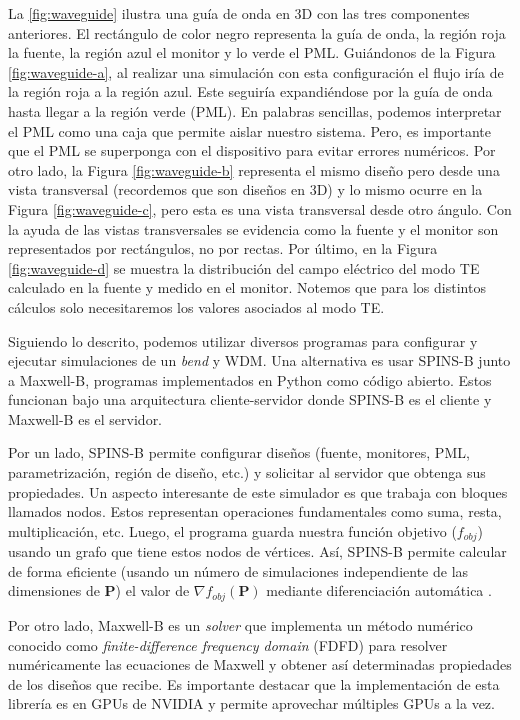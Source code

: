 La \autoref{fig:waveguide} ilustra una guía de onda en 3D con las tres componentes anteriores.
El rectángulo de color negro representa la guía de onda, la región roja la fuente, 
la región azul el monitor y lo verde el PML.
Guiándonos de la Figura \autoref{fig:waveguide-a}, al realizar una simulación con esta configuración 
el flujo iría de la región roja a la región azul. Este seguiría expandiéndose por la guía de onda hasta llegar a la región verde (PML).
En palabras sencillas, podemos interpretar el PML como una caja que permite aislar nuestro sistema. 
Pero, es importante que el PML se superponga con el dispositivo para evitar errores numéricos.
Por otro lado, la Figura \autoref{fig:waveguide-b} representa el mismo diseño pero desde una vista transversal
(recordemos que son diseños en 3D) y lo mismo ocurre en la Figura \autoref{fig:waveguide-c}, pero esta es una
vista transversal desde otro ángulo.
Con la ayuda de las vistas transversales se evidencia como la fuente y el monitor son representados por
rectángulos, no por rectas. Por último, en la Figura \autoref{fig:waveguide-d} se muestra la distribución
del campo eléctrico del modo TE calculado en la fuente y medido en el monitor. Notemos que para los distintos
cálculos solo necesitaremos los valores asociados al modo TE.

Siguiendo lo descrito, podemos utilizar diversos programas para configurar y ejecutar 
simulaciones de un \emph{bend} y WDM.
Una alternativa es usar SPINS-B junto a Maxwell-B, programas implementados en Python como código abierto.
Estos funcionan bajo una arquitectura cliente-servidor donde SPINS-B es el cliente y Maxwell-B es el servidor.

Por un lado, SPINS-B permite configurar diseños (fuente, monitores, PML, parametrización, región de diseño, etc.) y solicitar al servidor que obtenga sus propiedades.
Un aspecto interesante de este simulador es que trabaja con bloques llamados nodos.
Estos representan operaciones fundamentales como suma, resta, multiplicación, etc.
Luego, el programa guarda nuestra función objetivo ($f_{obj}$) usando un grafo que tiene estos nodos de vértices.
Así, SPINS-B permite calcular de forma eficiente
(usando un número de simulaciones independiente de las dimensiones de $\boldsymbol{P}$) 
el valor de $\nabla f_{obj}(\boldsymbol{P})$ mediante diferenciación automática \citep{Su2020, Mykel2019}.

Por otro lado, Maxwell-B es un \emph{solver} que implementa un método numérico conocido como \emph{finite-difference frequency domain}
(FDFD) para resolver numéricamente las ecuaciones de Maxwell y obtener así determinadas propiedades
de los diseños que recibe.
Es importante destacar que la implementación de esta librería es en GPUs de NVIDIA y permite
aprovechar múltiples GPUs a la vez.


